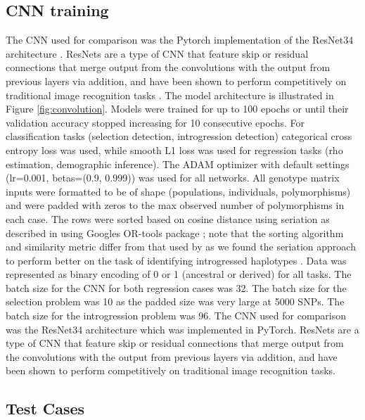 \subsection{CNN training}
The CNN used for comparison was the Pytorch \cite{paszkePyTorchImperativeStyle2019} implementation of the ResNet34 architecture \cite{heDeepResidualLearning2015a}. ResNets are a type of CNN that feature skip or residual connections that merge output from the convolutions with the output from previous layers via addition, and have been shown to perform competitively on traditional image recognition tasks \cite{reddiMLPerfInferenceBenchmark2020}. The model architecture is illustrated in Figure \ref{fig:convolution}. Models were trained for up to 100 epochs or until their validation accuracy stopped increasing for 10 consecutive epochs. For classification tasks (selection detection, introgression detection) categorical cross entropy loss was used, while smooth L1 \cite{girshickFastRCNN2015} loss was used for regression tasks (rho estimation, demographic inference). The ADAM optimizer with default settings (lr=0.001, betas=(0.9, 0.999)) \cite{kingmaAdamMethodStochastic2017} was used for all networks. All genotype matrix inputs were formatted to be of shape (populations, individuals, polymorphisms) and were padded with zeros to the max observed number of polymorphisms in each case. The rows were sorted based on cosine distance using seriation as described in \cite{rayIntroUNETIdentifyingIntrogressed2023} using Googles OR-tools package \cite{perronORTools2019}; note that the sorting algorithm and similarity metric differ from that used by \cite{flagelUnreasonableEffectivenessConvolutional2019} as we found the seriation approach to perform better on the task of identifying introgressed haplotypes \cite{rayIntroUNETIdentifyingIntrogressed2023}. Data was represented as binary encoding of 0 or 1 (ancestral or derived) for all tasks. 
The batch size for the CNN for both regression cases was 32. The batch size for the selection problem was 10 as the padded size was very large at 5000 SNPs. The batch size for the introgression problem was 96. The CNN used for comparison was the ResNet34 architecture \cite{heDeepResidualLearning2015} which was implemented in PyTorch. ResNets are a type of CNN that feature skip or residual connections that merge output from the convolutions with the output from previous layers via addition, and have been shown to perform competitively on traditional image recognition tasks. 

\subsection{Test Cases}
